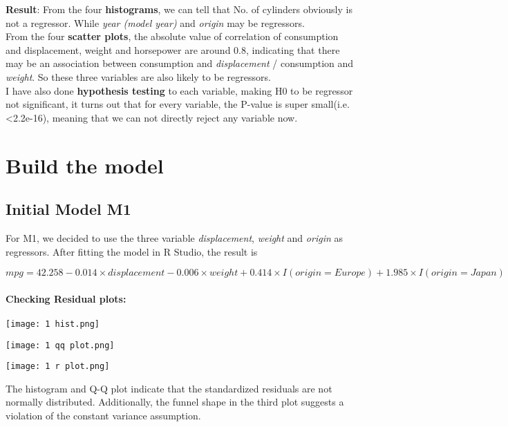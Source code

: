 \documentclass[12pt]{article}
\begin{document}
\textbf{Result}: \quad From the four \textbf{histograms}, we can tell that No. of cylinders obviously is not a regressor. While \textit{year (model year)} and \textit{origin} may be regressors.\\
\qquad From the four \textbf{scatter plots}, the absolute value of correlation of consumption and displacement, weight and horsepower are around 0.8, indicating that there may be an association between consumption and \textit{displacement} / consumption and \textit{weight}. So these three variables are also likely to be regressors.\\
\qquad I have also done \textbf{hypothesis testing }to each variable, making H0 to be regressor not significant, it turns out that for every variable, the P-value is super small(i.e. \textless 2.2e-16), meaning that we can not directly reject any variable now.



\section{Build the model}
\subsection{Initial Model M1}
For M1, we decided to use the three variable \textit{displacement}, \textit{weight} and \textit{origin} as regressors.
After fitting the model in R Studio, the result is 
\begin{center}
$ mpg = 42.258 - 0.014 \times displacement - 0.006 \times weight + 0.414\times I(origin = Europe) + 1.985 \times I(origin = Japan) $
\end{center}

\paragraph{Checking Residual plots:}
\begin{minipage}{\textwidth}
    \begin{minipage}[h]{0.3\linewidth}
        \centering
        \texttt{[image: 1 hist.png]}
        \label{a}
    \end{minipage}
    \begin{minipage}[h]{0.3\linewidth}
        \centering
        \texttt{[image: 1 qq plot.png]}
        \label{b}   
    \end{minipage}
    \begin{minipage}[h]{0.3\linewidth}
        \centering
        \texttt{[image: 1 r plot.png]}
        \label{b}   
    \end{minipage}
\end{minipage}
The histogram and Q-Q plot indicate that the standardized residuals are not normally distributed. Additionally, the funnel shape in the third plot suggests a violation of the constant variance assumption.\\ 
\end{document}
